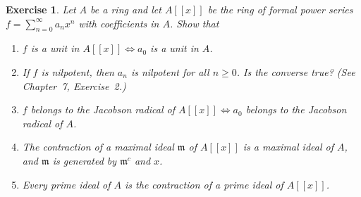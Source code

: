 \documentclass{article}
\theoremstyle{breakstyle}
\newtheorem{exercise}{Exercise}
\begin{document}
\begin{exercise}
Let \(A\) be a ring and let \(A[[x]]\) be the ring of formal power series \(f=\sum_{n=0}^{\infty}a_nx^n\) with coefficients in \(A\). Show that
\begin{enumerate}[label=(\roman*)]
    \item \(f\) is a unit in \(A[[x]]\Leftrightarrow a_0\) is a unit in \(A\).
    \item If \(f\) is nilpotent, then \(a_n\) is nilpotent for all \(n\ge0\). Is the converse true? (See Chapter~7, Exercise~2.)
    \item \(f\) belongs to the Jacobson radical of \(A[[x]]\Leftrightarrow a_0\) belongs to the Jacobson radical of \(A\).
    \item The contraction of a maximal ideal \(\mathfrak m\) of \(A[[x]]\) is a maximal ideal of \(A\), and \(\mathfrak m\) is generated by \(\mathfrak m^c\) and \(x\).
    \item Every prime ideal of \(A\) is the contraction of a prime ideal of \(A[[x]]\).
\end{enumerate}


\end{exercise}
\end{document}
